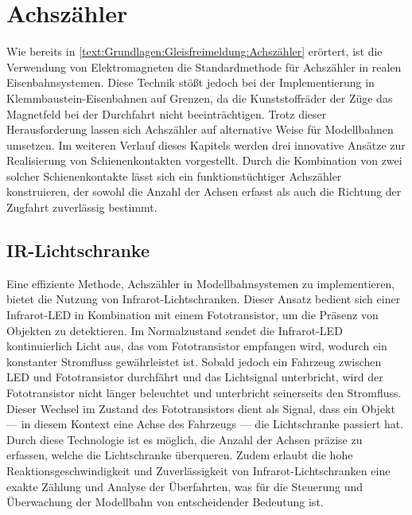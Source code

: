 \section{Achszähler}\label{text:Methodik:Achszähler}

Wie bereits in \autoref{text:Grundlagen:Gleisfreimeldung:Achszähler}  erörtert, ist die Verwendung von Elektromagneten die Standardmethode für Achszähler in realen Eisenbahnsystemen. Diese Technik stößt jedoch bei der Implementierung in Klemmbaustein-Eisenbahnen auf Grenzen, da die Kunststoffräder der Züge das Magnetfeld bei der Durchfahrt nicht beeinträchtigen. Trotz dieser Herausforderung lassen sich Achszähler auf alternative Weise für Modellbahnen umsetzen.
\newline
Im weiteren Verlauf dieses Kapitels werden drei innovative Ansätze zur Realisierung von Schienenkontakten vorgestellt. Durch die Kombination von zwei solcher Schienenkontakte lässt sich ein funktionstüchtiger Achszähler konstruieren, der sowohl die Anzahl der Achsen erfasst als auch die Richtung der Zugfahrt zuverlässig bestimmt.

\subsection{IR-Lichtschranke}\label{text:Methodik:Achszähler:Lichtschranke}

Eine effiziente Methode, Achszähler in Modellbahnsystemen zu implementieren, bietet die Nutzung von Infrarot-Lichtschranken. Dieser Ansatz bedient sich einer Infrarot-LED in Kombination mit einem Fototransistor, um die Präsenz von Objekten zu detektieren. Im Normalzustand sendet die Infrarot-LED kontinuierlich Licht aus, das vom Fototransistor empfangen wird, wodurch ein konstanter Stromfluss gewährleistet ist. Sobald jedoch ein Fahrzeug zwischen LED und Fototransistor durchfährt und das Lichtsignal unterbricht, wird der Fototransistor nicht länger beleuchtet und unterbricht seinerseits den Stromfluss. Dieser Wechsel im Zustand des Fototransistors dient als Signal, dass ein Objekt --- in diesem Kontext eine Achse des Fahrzeugs --- die Lichtschranke passiert hat.
\newline
Durch diese Technologie ist es möglich, die Anzahl der Achsen präzise zu erfassen, welche die Lichtschranke überqueren. Zudem erlaubt die hohe Reaktionsgeschwindigkeit und Zuverlässigkeit von Infrarot-Lichtschranken eine exakte Zählung und Analyse der Überfahrten, was für die Steuerung und Überwachung der Modellbahn von entscheidender Bedeutung ist.

